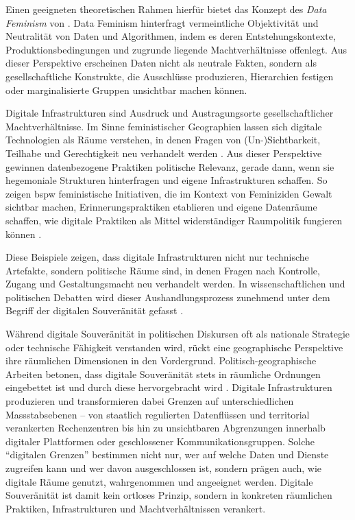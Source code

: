 Einen geeigneten theoretischen Rahmen hierfür bietet das Konzept des \textit{Data Feminism} von \textcite{dignazioDataFeminism2020}. Data Feminism hinterfragt vermeintliche Objektivität und Neutralität von Daten und Algorithmen, indem es deren Entstehungskontexte, Produktionsbedingungen und zugrunde liegende Machtverhältnisse offenlegt. Aus dieser Perspektive erscheinen Daten nicht als neutrale Fakten, sondern als gesellschaftliche Konstrukte, die Ausschlüsse produzieren, Hierarchien festigen oder marginalisierte Gruppen unsichtbar machen können.

Digitale Infrastrukturen sind Ausdruck und Austragungsorte gesellschaftlicher Machtverhältnisse. Im Sinne feministischer Geographien lassen sich digitale Technologien als Räume verstehen, in denen Fragen von (Un-)Sichtbarkeit, Teilhabe und Gerechtigkeit neu verhandelt werden \parencite{elwoodFeministDigitalGeographies2018}. Aus dieser Perspektive gewinnen datenbezogene Praktiken politische Relevanz, gerade dann, wenn sie hegemoniale Strukturen hinterfragen und eigene Infrastrukturen schaffen. So zeigen \gls{bspw} feministische Initiativen, die im Kontext von Feminiziden Gewalt sichtbar machen, Erinnerungspraktiken etablieren und eigene Datenräume schaffen, wie digitale Praktiken als Mittel widerständiger Raumpolitik fungieren können \parencite{dignazioGeographiesMissingData2024}.

Diese Beispiele zeigen, dass digitale Infrastrukturen nicht nur technische Artefakte, sondern politische Räume sind, in denen Fragen nach Kontrolle, Zugang und Gestaltungsmacht neu verhandelt werden. In wissenschaftlichen und politischen Debatten wird dieser Aushandlungsprozess zunehmend unter dem Begriff der digitalen Souveränität gefasst \parencite{glaszeContestedSpatialitiesDigital2023}.

Während digitale Souveränität in politischen Diskursen oft als nationale Strategie oder technische Fähigkeit verstanden wird, rückt eine geographische Perspektive ihre räumlichen Dimensionen in den Vordergrund. Politisch-geographische Arbeiten betonen, dass digitale Souveränität stets in räumliche Ordnungen eingebettet ist und durch diese hervorgebracht wird \parencite{glaszeContestedSpatialitiesDigital2023,zhangBordersBorderingSovereignty2023}. Digitale Infrastrukturen produzieren und transformieren dabei Grenzen auf unterschiedlichen Massstabsebenen -- von staatlich regulierten Datenflüssen und territorial verankerten Rechenzentren bis hin zu unsichtbaren Abgrenzungen innerhalb digitaler Plattformen oder geschlossener Kommunikationsgruppen. Solche \enquote{digitalen Grenzen} bestimmen nicht nur, wer auf welche Daten und Dienste zugreifen kann und wer davon ausgeschlossen ist, sondern prägen auch, wie digitale Räume genutzt, wahrgenommen und angeeignet werden. Digitale Souveränität ist damit kein ortloses Prinzip, sondern in konkreten räumlichen Praktiken, Infrastrukturen und Machtverhältnissen verankert.

